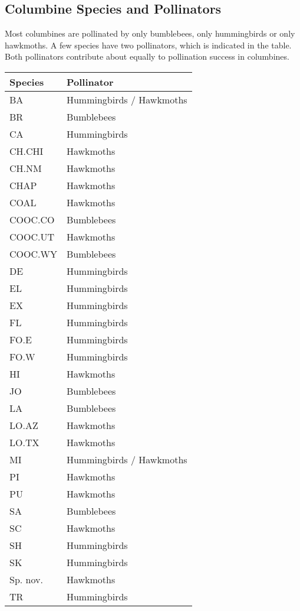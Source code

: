 \documentclass[11pt, addpoints]{exam}
\begin{document}
\subsection*{Columbine Species and Pollinators}

Most columbines are pollinated by only bumblebees, only hummingbirds or
only hawkmoths. A few species have two pollinators, which is indicated
in the table. Both pollinators contribute about equally to pollination
success in columbines.

\vspace{\baselineskip}

\begin{tabular}[c]{@{}ll@{}}
\toprule
Species & Pollinator\tabularnewline
\midrule
BA & Hummingbirds / Hawkmoths\tabularnewline
BR & Bumblebees\tabularnewline
CA & Hummingbirds\tabularnewline
CH.CHI & Hawkmoths\tabularnewline
CH.NM & Hawkmoths\tabularnewline
CHAP & Hawkmoths\tabularnewline
COAL & Hawkmoths\tabularnewline
COOC.CO & Bumblebees\tabularnewline
COOC.UT & Hawkmoths\tabularnewline
COOC.WY & Bumblebees\tabularnewline
DE & Hummingbirds\tabularnewline
EL & Hummingbirds\tabularnewline
EX & Hummingbirds\tabularnewline
FL & Hummingbirds\tabularnewline
FO.E & Hummingbirds\tabularnewline
FO.W & Hummingbirds\tabularnewline
HI & Hawkmoths\tabularnewline
JO & Bumblebees\tabularnewline
LA & Bumblebees\tabularnewline
LO.AZ & Hawkmoths\tabularnewline
LO.TX & Hawkmoths\tabularnewline
MI & Hummingbirds / Hawkmoths\tabularnewline
PI & Hawkmoths\tabularnewline
PU & Hawkmoths\tabularnewline
SA & Bumblebees\tabularnewline
SC & Hawkmoths\tabularnewline
SH & Hummingbirds\tabularnewline
SK & Hummingbirds\tabularnewline
Sp. nov.\footnotemark & Hawkmoths\tabularnewline
TR & Hummingbirds\tabularnewline
\bottomrule
\end{tabular}

\end{document}
